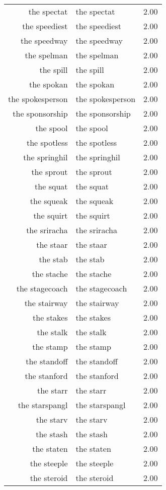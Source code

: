 \begin{table}[ht]
\begin{tabular}{rlr}
  the spectat & the spectat & 2.00 \\ 
  the speediest & the speediest & 2.00 \\ 
  the speedway & the speedway & 2.00 \\ 
  the spelman & the spelman & 2.00 \\ 
  the spill & the spill & 2.00 \\ 
  the spokan & the spokan & 2.00 \\ 
  the spokesperson & the spokesperson & 2.00 \\ 
  the sponsorship & the sponsorship & 2.00 \\ 
  the spool & the spool & 2.00 \\ 
  the spotless & the spotless & 2.00 \\ 
  the springhil & the springhil & 2.00 \\ 
  the sprout & the sprout & 2.00 \\ 
  the squat & the squat & 2.00 \\ 
  the squeak & the squeak & 2.00 \\ 
  the squirt & the squirt & 2.00 \\ 
  the sriracha & the sriracha & 2.00 \\ 
  the staar & the staar & 2.00 \\ 
  the stab & the stab & 2.00 \\ 
  the stache & the stache & 2.00 \\ 
  the stagecoach & the stagecoach & 2.00 \\ 
  the stairway & the stairway & 2.00 \\ 
  the stakes & the stakes & 2.00 \\ 
  the stalk & the stalk & 2.00 \\ 
  the stamp & the stamp & 2.00 \\ 
  the standoff & the standoff & 2.00 \\ 
  the stanford & the stanford & 2.00 \\ 
  the starr & the starr & 2.00 \\ 
  the starspangl & the starspangl & 2.00 \\ 
  the starv & the starv & 2.00 \\ 
  the stash & the stash & 2.00 \\ 
  the staten & the staten & 2.00 \\ 
  the steeple & the steeple & 2.00 \\ 
  the steroid & the steroid & 2.00 \\ 

\end{tabular}
\end{table}
